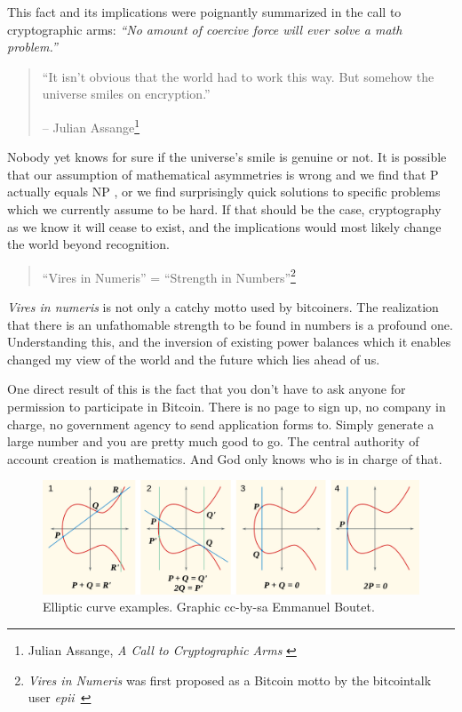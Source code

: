 This fact and its implications were poignantly summarized in the call
to cryptographic arms: \textit{\enquote{No amount of coercive force will ever solve
a math problem.}}

\begin{quotation}\begin{samepage}
\enquote{It isn't obvious that the world had to work this way. But somehow the
universe smiles on encryption.}
\begin{flushright} -- Julian Assange\footnote{Julian Assange, \textit{A Call to Cryptographic Arms} \cite{call-to-cryptographic-arms}}
\end{flushright}\end{samepage}\end{quotation}

Nobody yet knows for sure if the universe's smile is genuine or not. It
is possible that our assumption of mathematical asymmetries is wrong and
we find that P actually equals NP \cite{wiki:pnp}, or we find surprisingly quick
solutions to specific problems \cite{wiki:discrete-log} which we currently assume to be hard.
If that should be the case, cryptography as we know it will cease to
exist, and the implications would most likely change the world beyond
recognition.

\begin{quotation}\begin{samepage}
\enquote{Vires in Numeris} = \enquote{Strength in Numbers}\footnote{\textit{Vires in Numeris} was first proposed as a Bitcoin motto by the bitcointalk user \textit{epii}~\cite{epii}}
\end{samepage}\end{quotation}

\textit{Vires in numeris} is not only a catchy motto used by bitcoiners. The
realization that there is an unfathomable strength to be found in
numbers is a profound one. Understanding this, and the inversion of
existing power balances which it enables changed my view of the world
and the future which lies ahead of us.

One direct result of this is the fact that you don't have to ask anyone
for permission to participate in Bitcoin. There is no page to sign up,
no company in charge, no government agency to send application forms to.
Simply generate a large number and you are pretty much good to go. The
central authority of account creation is mathematics. And God only knows
who is in charge of that.

\begin{figure}
  \includegraphics{assets/images/elliptic-curve-examples.png}
  \caption{Elliptic curve examples. Graphic cc-by-sa Emmanuel Boutet.}
  \label{fig:elliptic-curve-examples}
\end{figure}

